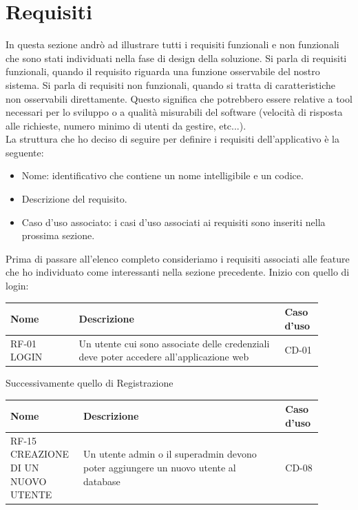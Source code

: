 \section{Requisiti}
In questa sezione andrò ad illustrare tutti i requisiti funzionali e non funzionali che sono stati individuati nella fase di design della soluzione. Si parla di requisiti funzionali, quando il requisito riguarda una funzione osservabile del nostro sistema. Si parla di requisiti non funzionali, quando si tratta di caratteristiche non osservabili direttamente. Questo significa che potrebbero essere relative a tool necessari per lo sviluppo o a qualità misurabili del software (velocità di risposta alle richieste, numero minimo di utenti da gestire, etc...).\cite{Larman2016}
\\
La struttura che ho deciso di seguire per definire i requisiti dell'applicativo è la seguente:
\begin{itemize}
    \item Nome: identificativo che contiene un nome intelligibile e un codice.
    \item Descrizione del requisito.
    \item Caso d'uso associato: i casi d'uso associati ai requisiti sono inseriti nella prossima sezione.
\end{itemize}
Prima di passare all'elenco completo consideriamo i requisiti associati alle feature che ho individuato come interessanti nella sezione precedente. Inizio con quello di login:
\begin{center}
    \begin{tabular}{|p{0.2\linewidth}|p{0.60\linewidth}|p{0.10\linewidth}|}
    \hline
    \textbf{Nome} & \textbf{Descrizione} & \textbf{Caso d'uso} \\
    \hline
    \rowcolor{Orange}
    RF-01 LOGIN & Un utente cui sono associate delle credenziali deve poter accedere all’applicazione web & CD-01 \\
    \hline
    \end{tabular}
\end{center}
Successivamente quello di Registrazione
\begin{center}
    \begin{tabular}{|p{0.2\linewidth}|p{0.60\linewidth}|p{0.10\linewidth}|}
    \hline
    \textbf{Nome} & \textbf{Descrizione} & \textbf{Caso d'uso} \\
    \hline
    \rowcolor{DarkOrange}
    RF-15 CREAZIONE DI UN NUOVO UTENTE & Un utente admin o il superadmin devono poter aggiungere un nuovo utente al database & CD-08 \\
    \hline
    \end{tabular}
\end{center}
